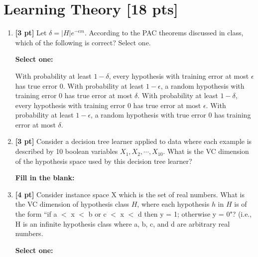 \documentclass[12pt,addpoints,answers]{exam}
\begin{document}
\section{Learning Theory [18 pts]}
\begin{enumerate}
    \item \textbf{[3 pt]} Let $\delta=|H|e^{-\epsilon m}$. According to the PAC theorems discussed in class, which of the following is correct? Select one.

    \textbf{Select one:}
    \begin{checkboxes}
        \choice With probability at least $1- \delta$, every hypothesis with training error at most $\epsilon$ has true error 0.
        \choice With probability at least $1-\epsilon$, a random hypothesis with training error 0 has true error at most $\delta$.
        \choice With probability at least $1-\delta$, every hypothesis with training error 0 has true error at most $\epsilon$.
        \choice With probability at least $1-\epsilon$, a random hypothesis with true error 0 has training error at most $\delta$.
    \end{checkboxes}
    
    
    \item \textbf{[3 pt]} Consider a decision tree learner applied to data where each example is described by 10 boolean variables $X_1, X_2, \cdots, X_{10}$. What is the VC dimension of the hypothesis space used by this decision tree learner?
    
    \textbf{Fill in the blank:}
    
    \begin{tcolorbox}[fit,height=1cm, width=4cm, blank, borderline={1pt}{-2pt},nobeforeafter]
    
    \end{tcolorbox}   
    
    
    \item \textbf{[4 pt]} Consider instance space X which is the set of real numbers. What is the VC dimension of hypothesis class $H$, where each hypothesis $h$ in $H$ is of the form  ``if a $<$ x $<$ b or c $<$ x $<$ d then y = 1; otherwise y = 0"?  (i.e., H is an infinite hypothesis class where a, b, c, and d are arbitrary real numbers.

    \textbf{Select one:}
    \begin{checkboxes}
    \end{checkboxes}
    


\end{enumerate}
\end{document}
